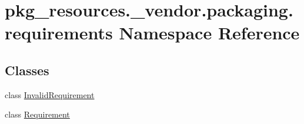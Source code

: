 \hypertarget{namespacepkg__resources_1_1__vendor_1_1packaging_1_1requirements}{}\section{pkg\+\_\+resources.\+\_\+vendor.\+packaging.\+requirements Namespace Reference}
\label{namespacepkg__resources_1_1__vendor_1_1packaging_1_1requirements}
\subsection*{Classes}
\begin{DoxyCompactItemize}
\item 
class \hyperlink{classpkg__resources_1_1__vendor_1_1packaging_1_1requirements_1_1InvalidRequirement}{Invalid\+Requirement}
\item 
class \hyperlink{classpkg__resources_1_1__vendor_1_1packaging_1_1requirements_1_1Requirement}{Requirement}
\end{DoxyCompactItemize}
